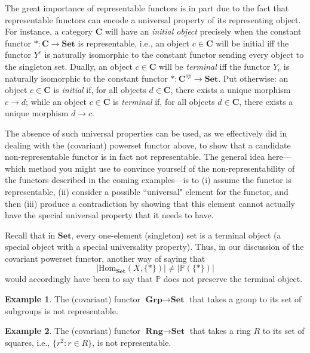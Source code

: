 \documentclass[11pt]{book}
\theoremstyle{definition}
\newtheorem{example}{Example}[section]
\theoremstyle{definition}
\theoremstyle{definition}
\theoremstyle{theorem}
\theoremstyle{definition}
\begin{document}
The great importance of representable functors is in part due to the fact that representable functors can encode a universal property of its representing object. For instance, a category $\textbf{C}$ will have an \textit{initial object} precisely when the constant functor $*: \textbf{C} \rightarrow \textbf{Set}$ is representable, i.e., an object $c \in \textbf{C}$ will be initial iff the functor $Y^c$ is naturally isomorphic to the constant functor sending every object to the singleton set. Dually, an object $c \in \textbf{C}$ will be \textit{terminal} iff the functor $Y_c$ is naturally isomorphic to the constant functor $*: \textbf{C}^{op} \rightarrow \textbf{Set}$. Put otherwise: an object $c \in \textbf{C}$ is \textit{initial} if, for all objects $d \in \textbf{C}$, there exists a unique morphism $c \rightarrow d$; while an object $c \in \textbf{C}$ is \textit{terminal} if, for all objects $d \in \textbf{C}$, there exists a unique morphism $d \rightarrow c$.\par
The absence of such universal properties can be used, as we effectively did in dealing with the (covariant) powerset functor above, to show that a candidate non-representable functor is in fact not representable. The general idea here---which method you might use to convince yourself of the non-representability of the functors described in the coming examples---is to (i) assume the functor is representable, (ii) consider a possible ``universal" element for the functor, and then (iii) produce a contradiction by showing that this element cannot actually have the special universal property that it needs to have. \par 
Recall that in $\textbf{Set}$, every one-element (singleton) set is a terminal object (a special object with a special universality property). Thus, in our discussion of the covariant powerset functor, another way of saying that 
\begin{equation*}
|\text{Hom}_{\textbf{Set}}(X, \{*\})| \neq |\mathbb{P}(\{*\})|
\end{equation*} 
would accordingly have been to say that $\mathbb{P}$ does not preserve the terminal object. 
\begin{example}
	The (covariant) functor $\textbf{Grp} \rightarrow \textbf{Set}$ that takes a group to its set of subgroups is not representable. 	
\end{example} 
\begin{example}
	The (covariant) functor $\textbf{Rng} \rightarrow \textbf{Set}$ that takes a ring $R$ to its set of squares, i.e., $\{r^2: r \in R\}$, is not representable. 
\end{example}
\end{document}
